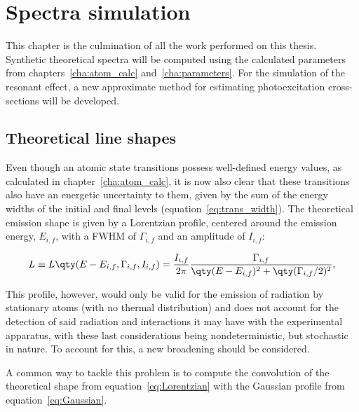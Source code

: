 
%

\chapter{Spectra simulation}
 
This chapter is the culmination of all the work performed on this thesis. Synthetic theoretical spectra will be computed using the calculated parameters from chapters~\ref{cha:atom_calc} and~\ref{cha:parameters}. For the simulation of the resonant effect, a new approximate method for estimating photoexcitation cross-sections will be developed.

\section{Theoretical line shapes}

Even though an atomic state transitions possess well-defined energy values, as calculated in chapter~\ref{cha:atom_calc}, it is now also clear that these transitions also have an energetic uncertainty to them, given by the sum of the energy widths of the initial and final levels (equation~\eqref{eq:trans_width}). The theoretical emission shape is given by a Lorentzian profile, centered around the emission energy, $E_{i,f}$, with a FWHM of $\Gamma_{i,f}$ and an amplitude of $I_{i,f}$:

\begin{equation}
    L\equiv L\qty(E-E_{i,f},\Gamma_{i,f},I_{i,f})=\frac{I_{i,f}}{2\pi}\frac{\Gamma_{i,f}}{\qty(E-E_{i,f})^2+\qty(\Gamma_{i,f}/2)^2},
    \label{eq:Lorentzian}
\end{equation}

This profile, however, would only be valid for the emission of radiation by stationary atoms (with no thermal distribution) and does not account for the detection of said radiation and interactions it may have with the experimental apparatus, with these last considerations being nondeterministic, but stochastic in nature. To account for this, a new broadening should be considered.

A common way to tackle this problem is to compute the convolution of the theoretical shape from equation~\eqref{eq:Lorentzian} with the Gaussian profile from equation~\eqref{eq:Gaussian}. 

